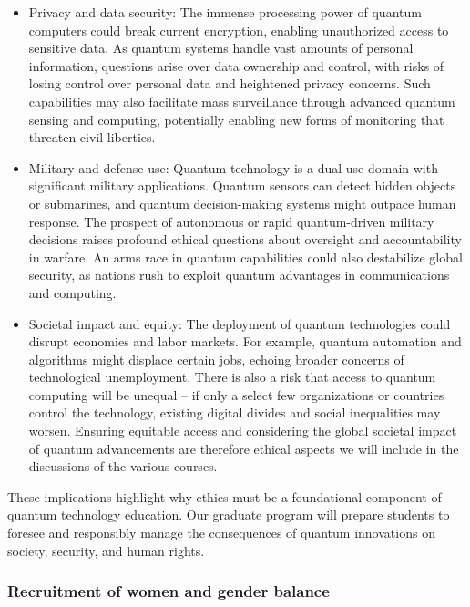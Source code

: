 \documentclass{scrreprt}
\begin{document}
\begin{itemize}
\item Privacy and data security: The immense processing power of quantum computers could break current encryption, enabling unauthorized access to sensitive data. As quantum systems handle vast amounts of personal information, questions arise over data ownership and control, with risks of losing control over personal data and heightened privacy concerns. Such capabilities may also facilitate mass surveillance through advanced quantum sensing and computing, potentially enabling new forms of monitoring that threaten civil liberties.
\item Military and defense use: Quantum technology is a dual-use domain with significant military applications. Quantum sensors can detect hidden objects or submarines, and quantum decision-making systems might outpace human response. The prospect of autonomous or rapid quantum-driven military decisions raises profound ethical questions about oversight and accountability in warfare. An arms race in quantum capabilities could also destabilize global security, as nations rush to exploit quantum advantages in communications and computing.
\item Societal impact and equity: The deployment of quantum technologies could disrupt economies and labor markets. For example, quantum automation and algorithms might displace certain jobs, echoing broader concerns of technological unemployment. There is also a risk that access to quantum computing will be unequal – if only a select few organizations or countries control the technology, existing digital divides and social inequalities may worsen. Ensuring equitable access and considering the global societal impact of quantum advancements are therefore ethical aspects we will include in the discussions of the various courses.
\end{itemize}



These implications highlight why ethics must be a foundational
component of quantum technology education. Our graduate program will
prepare students to foresee and responsibly manage the consequences of
quantum innovations on society, security, and human rights.


\subsubsection{Recruitment of women and gender balance}
\end{document}
